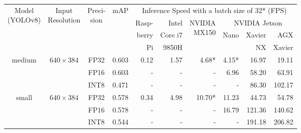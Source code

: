 \begin{appendices}
\begin{table}
    \footnotesize
    \centering
    \begin{tabular}{|c|c|c|c|rrrrrr|}
        \hline
        \multirow{4}{*}{\parbox{1.6cm}{\centering Model\\(YOLOv8)}} &
          \multirow{4}{*}{\parbox{1.5cm}{\centering Input\\Resolution}} &
            \multirow{4}{*}{\parbox{0.9cm}{\centering Preci-\\sion}} &
              \multirow{4}{*}{mAP} &
                \multicolumn{6}{c|}{Inference Speed with a batch size of 32* (FPS)} \\
        \cline{5-10}
        & & & & Rasp- & Intel   &\multirow{3}{*}{\parbox{1.2cm}{\raggedleft NVIDIA\\MX150}} & \multicolumn{3}{|c|}{NVIDIA Jetson} \\
        \cline{8-10}
        & & & & berry & Core i7 &                                                           & \multicolumn{1}{|c}{\multirow{2}{*}{Nano}} & Xavier & AGX \\
        & & & & Pi    & 9850H   &                                                           & \multicolumn{1}{|c}{}                      & NX     & Xavier \\
        \hline
        \hline
        \multirow{3}{*}{medium}                                   & \multirow{3}{*}{$640 \times 384$} & FP32 & 0.603 & 0.12  &   1.57 &  4.68* &  4.15* &   16.97 &   19.11 \\
                                                                  &                                   & FP16 & 0.603 &    -  &      - &      - &   6.96 &   58.20 &   63.91 \\
                                                                  &                                   & INT8 & 0.471 &    -  &      - &      - &      - &   86.30 &  102.17 \\
        \hline
        \multirow{3}{*}{small}                                    & \multirow{3}{*}{$640 \times 384$} & FP32 & 0.578 & 0.34  &   4.98 & 10.70* &  11.23 &   44.73 &   54.78 \\
                                                                  &                                   & FP16 & 0.578 &    -  &      - &      - &  16.79 &  121.36 &  140.62 \\
                                                                  &                                   & INT8 & 0.544 &    -  &      - &      - &      - &  191.18 &  206.82 \\

\end{tabular}
\end{table}
\end{appendices}
